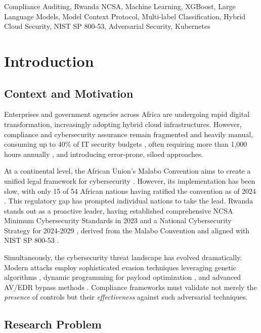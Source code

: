 \documentclass[11pt,conference]{IEEEtran}
\begin{document}
\begin{IEEEkeywords}
Compliance Auditing, Rwanda NCSA, Machine Learning, XGBoost, Large Language Models, Model Context Protocol, Multi-label Classification, Hybrid Cloud Security, NIST SP 800-53, Adversarial Security, Kubernetes
\end{IEEEkeywords}

\section{Introduction}

\subsection{Context and Motivation}

Enterprises and government agencies across Africa are undergoing rapid digital transformation, increasingly adopting hybrid cloud infrastructures. However, compliance and cybersecurity assurance remain fragmented and heavily manual, consuming up to 40\% of IT security budgets \cite{ponemon_cost}, often requiring more than 1,000 hours annually \cite{cogr_report}, and introducing error-prone, siloed approaches.

At a continental level, the African Union's Malabo Convention aims to create a unified legal framework for cybersecurity \cite{malabo2014}. However, its implementation has been slow, with only 15 of 54 African nations having ratified the convention as of 2024 \cite{au_cybersecurity_status}. This regulatory gap has prompted individual nations to take the lead. Rwanda stands out as a proactive leader, having established comprehensive NCSA Minimum Cybersecurity Standards in 2023 \cite{ncsa2023} and a National Cybersecurity Strategy for 2024-2029 \cite{rwanda_strategy_2024}, derived from the Malabo Convention and aligned with NIST SP 800-53 \cite{nist2020}.

Simultaneously, the cybersecurity threat landscape has evolved dramatically. Modern attacks employ sophisticated evasion techniques leveraging genetic algorithms \cite{ga_xss_paper}, dynamic programming for payload optimization \cite{dp_payload_paper}, and advanced AV/EDR bypass methods \cite{reverse_shell_paper, mitre_attack_sok}. Compliance frameworks must validate not merely the \textit{presence} of controls but their \textit{effectiveness} against such adversarial techniques.

\subsection{Research Problem}
\end{document}
